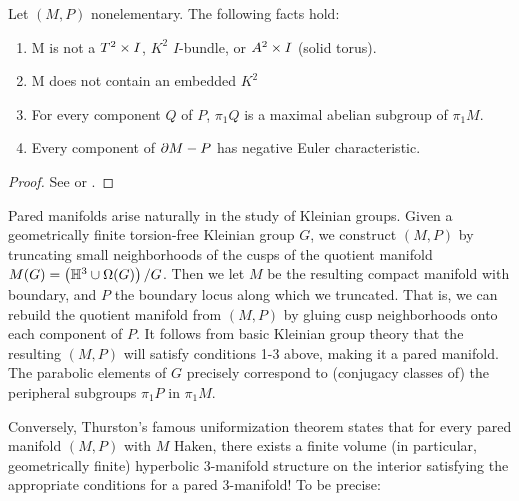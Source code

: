 \begin{prop}

Let $(M,P)$ nonelementary. The following facts hold:

\begin{enumerate}
\item M is not a $T^2\times I$, $K^2$ $I$-bundle, or $A^2\times I$ (solid torus).
\item M does not contain an embedded $K^2$
\item For every component $Q$ of $P$, $\pi_1Q$ is a maximal abelian subgroup of
$\pi_1M$.
\item Every component of $\partial M-P$ has negative Euler characteristic.
\end{enumerate}

\end{prop}
\begin{proof}
See \cite{CMc} or \cite{Mo}.
\end{proof}

Pared manifolds arise naturally in the study of Kleinian groups. Given
a geometrically finite torsion-free Kleinian group $G$, we construct $(M,P)$ by
truncating small neighborhoods of the cusps of the quotient manifold $M(G)
= \left(\mathbb{H}^3\cup \Omega(G)\right)/G$.  Then we let $M$ be the resulting
compact manifold with boundary, and $P$ the boundary locus along which we
truncated.  That is, we can rebuild the quotient manifold from $(M,P)$ by
gluing cusp neighborhoods onto each component of $P$. It follows from basic
Kleinian group theory that the resulting $(M,P)$ will satisfy conditions 1-3
above, making it a pared manifold.  The parabolic elements of $G$ precisely
correspond to (conjugacy classes of) the peripheral subgroups $\pi_1P$ in
$\pi_1M$.

Conversely, Thurston's famous uniformization theorem states that for every
pared manifold $(M,P)$ with $M$ Haken, there exists a finite volume (in
particular, geometrically finite) hyperbolic 3-manifold structure on the
interior satisfying the appropriate conditions for a pared 3-manifold! To be
precise:



